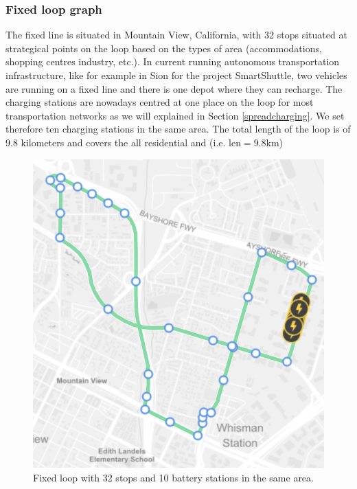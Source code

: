 \documentclass[12pt,a4paper]{article}
\begin{document}
\subsubsection{Fixed loop graph}
The fixed line is situated in Mountain View, California, with 32 stops situated at strategical points on the loop based on the types of area (accommodations, shopping centres industry, etc.). In current running autonomous transportation infrastructure, like for example in Sion for the project SmartShuttle, two vehicles are running on a fixed line and there is one depot where they can recharge. The charging stations are nowadays centred at one place on the loop for most transportation networks as we will explained in Section \ref{spreadcharging}. We set therefore ten charging stations in the same area. The total length of the loop is of 9.8 kilometers and covers the all residential and   (i.e. $\text{len} = 9.8\text{km}$)

\begin{figure}
  \centering
\includegraphics[scale=0.5]{./images/graph}
\caption{Fixed loop with 32 stops and 10 battery stations in the same area.}
\label{graph}
\end{figure}
\end{document}
